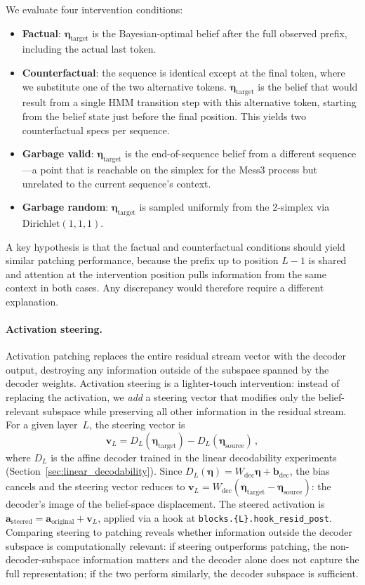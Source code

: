 \documentclass[midterm]{sparreport}
\begin{document}
We evaluate four intervention conditions:
\begin{itemize}
  \item \textbf{Factual}: $\boldsymbol{\eta}_{\mathrm{target}}$ is the Bayesian-optimal belief after the full observed prefix, including the actual last token.
  \item \textbf{Counterfactual}: the sequence is identical except at the final token, where we substitute one of the two alternative tokens. $\boldsymbol{\eta}_{\mathrm{target}}$ is the belief that would result from a single HMM transition step with this alternative token, starting from the belief state just before the final position. This yields two counterfactual specs per sequence.
  \item \textbf{Garbage valid}: $\boldsymbol{\eta}_{\mathrm{target}}$ is the end-of-sequence belief from a different sequence---a point that is reachable on the simplex for the Mess3 process but unrelated to the current sequence's context.
  \item \textbf{Garbage random}: $\boldsymbol{\eta}_{\mathrm{target}}$ is sampled uniformly from the 2-simplex via $\mathrm{Dirichlet}(1,1,1)$.
\end{itemize}

A key hypothesis is that the factual and counterfactual conditions should yield similar patching performance, because the prefix up to position $L{-}1$ is shared and attention at the intervention position pulls information from the same context in both cases. Any discrepancy would therefore require a different explanation.

\paragraph{Activation steering.}
Activation patching replaces the entire residual stream vector with the decoder output, destroying any information outside of the subspace spanned by the decoder weights. Activation steering is a lighter-touch intervention: instead of replacing the activation, we \emph{add} a steering vector that modifies only the belief-relevant subspace while preserving all other information in the residual stream. For a given layer~$L$, the steering vector is
\[
  \mathbf{v}_L = D_L(\boldsymbol{\eta}_{\mathrm{target}}) - D_L(\boldsymbol{\eta}_{\mathrm{source}})\,,
\]
where $D_L$ is the affine decoder trained in the linear decodability experiments (Section~\ref{sec:linear_decodability}). Since $D_L(\boldsymbol{\eta}) = W_{\mathrm{dec}}\boldsymbol{\eta} + \mathbf{b}_{\mathrm{dec}}$, the bias cancels and the steering vector reduces to $\mathbf{v}_L = W_{\mathrm{dec}}(\boldsymbol{\eta}_{\mathrm{target}} - \boldsymbol{\eta}_{\mathrm{source}})$: the decoder's image of the belief-space displacement. The steered activation is $\mathbf{a}_{\mathrm{steered}} = \mathbf{a}_{\mathrm{original}} + \mathbf{v}_L$, applied via a hook at \texttt{blocks.\{L\}.hook\_resid\_post}. Comparing steering to patching reveals whether information outside the decoder subspace is computationally relevant: if steering outperforms patching, the non-decoder-subspace information matters and the decoder alone does not capture the full representation; if the two perform similarly, the decoder subspace is sufficient.
\end{document}
